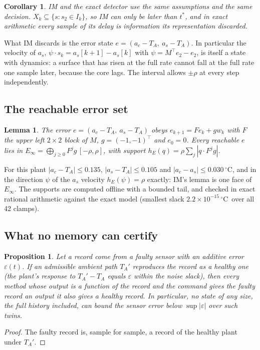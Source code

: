 \documentclass[11pt,a4paper]{article}
\newtheorem{proposition}{Proposition}
\newtheorem{lemma}{Lemma}
\newtheorem{corollary}{Corollary}
\newcommand{\degC}{\ensuremath{{}^\circ}C}
\newcommand{\sci}[2]{\ensuremath{#1\times10^{#2}}}
\newcommand{\tstar}{t^{\ast}}
\begin{document}
\begin{corollary}\label{cor:im}
IM and the exact detector use the same assumptions and the same decision. $X_k\subseteq\{s : s_2\in I_k\}$, so IM can
only be later than $\tstar$, and in exact arithmetic every sample of its delay is information its representation
discarded.
\end{corollary}

What IM discards is the error state $e = (a_c - T_A,\ a_s - T_A)$. In particular the velocity of $a_s$,
$\psi\cdot s_k = a_s[k+1]-a_s[k]$ with $\psi = M^\top e_2 - e_2$, is itself a state with dynamics: a surface that has risen at
the full rate cannot fall at the full rate one sample later, because the core lags. The interval allows $\pm\rho$ at
every step independently.

\subsection{The reachable error set}

\begin{lemma}\label{lem:err}
The error $e = (a_c - T_A,\ a_s - T_A)$ obeys $e_{k+1} = F e_k + g w_k$ with $F$ the upper left $2\times2$ block of $M$,
$g = (-1,-1)^\top$ and $e_0 = 0$. Every reachable $e$ lies in $E_\infty = \bigoplus_{j\ge0}F^j g\,[-\rho,\rho]$, with
support $h_E(q) = \rho\sum_j|q\cdot F^j g|$.
\end{lemma}

For this plant $|a_c - T_A|\le 0.135$, $|a_s - T_A|\le 0.105$ and $|a_c - a_s|\le 0.030$\,\degC, and in the direction
$\psi$ of the $a_s$ velocity $h_E(\psi) = \rho$ exactly: IM's lemma is one face of $E_\infty$. The supports are computed offline with
a bounded tail, and checked in exact rational arithmetic against the exact model (smallest slack \sci{2.2}{-15}\,\degC\
over all 42 clamps).

\subsection{What no memory can certify}\label{sec:twin}

\begin{proposition}\label{prop:twin}
Let a record come from a faulty sensor with an additive error $\varepsilon(t)$. If an admissible ambient path $T_A'$
reproduces the record as a healthy one (the plant's response to $T_A' - T_A$ equals $\varepsilon$ within the noise
slack), then every method whose output is a function of the record and the command gives the faulty record an output
it also gives a healthy record. In particular, no state of any size, the full history included, can bound the sensor
error below $\sup|\varepsilon|$ over such twins.
\end{proposition}
\begin{proof}
The faulty record is, sample for sample, a record of the healthy plant under $T_A'$.
\end{proof}
\end{document}
